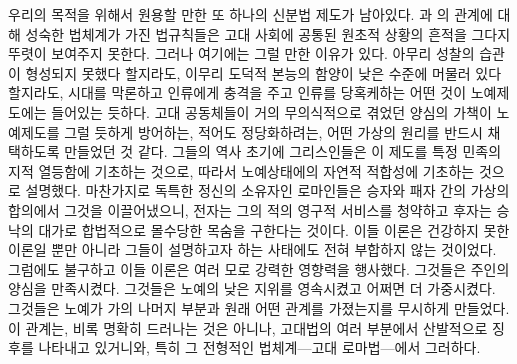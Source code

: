 우리의 목적을 위해서 원용할 만한 또 하나의 신분법 제도가 남아있다.
과 의 관계에 대해 성숙한 법체계가 가진 법규칙들은
고대 사회에 공통된 원초적 상황의 흔적을 그다지 뚜렷이 보여주지 못한다.
그러나 여기에는 그럴 만한 이유가 있다.
아무리 성찰의 습관이 형성되지 못했다 할지라도,
이무리 도덕적 본능의 함양이 낮은 수준에 머물러 있다 할지라도,
시대를 막론하고 인류에게 충격을 주고 인류를 당혹케하는 어떤 것이
노예제도에는 들어있는 듯하다.
고대 공동체들이 거의 무의식적으로 겪었던 양심의 가책이
노예제도를 그럴 듯하게 방어하는, 적어도 정당화하려는,
어떤 가상의 원리를
반드시
채택하도록 만들었던 것 같다.
그들의 역사 초기에 그리스인들은
이 제도를
특정 민족의 지적 열등함에 기초하는 것으로,
따라서 노예상태에의 자연적 적합성에 기초하는 것으로
설명했다.
마찬가지로 독특한 정신의 소유자인 로마인들은
승자와 패자 간의 가상의 합의에서 그것을 이끌어냈으니,
전자는 그의 적의 영구적 서비스를 청약하고
후자는 승낙의 대가로 합법적으로 몰수당한 목숨을 구한다는 것이다.
이들 이론은 건강하지 못한 이론일 뿐만 아니라
그들이 설명하고자 하는 사태에도 전혀 부합하지 않는 것이었다.
그럼에도 불구하고 이들 이론은 여러 모로 강력한 영향력을 행사했다.
그것들은 주인의 양심을 만족시켰다.
그것들은 노예의 낮은 지위를 영속시켰고 어쩌면 더 가중시켰다.
그것들은 노예가 가의 나머지 부분과 원래 어떤 관계를 가졌는지를
무시하게 만들었다.
이 관계는, 비록 명확히 드러나는 것은 아니나,
고대법의 여러 부분에서 산발적으로 징후를 나타내고 있거니와,
특히 그 전형적인 법체계---고대 로마법---에서 그러하다.


